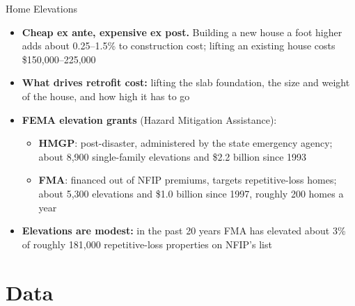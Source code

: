 \documentclass[serif, aspectratio=169, 10pt]{beamer}
\begin{document}
\begin{frame}{Home Elevations}
\begin{itemize}
    \item \textbf{Cheap ex ante, expensive ex post.} Building a new house a foot higher adds about 0.25--1.5\% to construction cost; lifting an existing house costs \$150{,}000--225{,}000
    \item \textbf{What drives retrofit cost:} lifting the slab foundation, the size and weight of the house, and how high it has to go
    \item \textbf{FEMA elevation grants} (Hazard Mitigation Assistance):
    \begin{itemize}
        \item \textbf{HMGP}: post-disaster, administered by the state emergency agency; about 8{,}900 single-family elevations and \$2.2 billion since 1993
        \item \textbf{FMA}: financed out of NFIP premiums, targets repetitive-loss homes; about 5{,}300 elevations and \$1.0 billion since 1997, roughly 200 homes a year
    \end{itemize}
    \item \textbf{Elevations are modest:} in the past 20 years FMA has elevated about 3\% of roughly 181{,}000 repetitive-loss properties on NFIP's list
\end{itemize}
\end{frame}

\section{Data}
\end{document}
